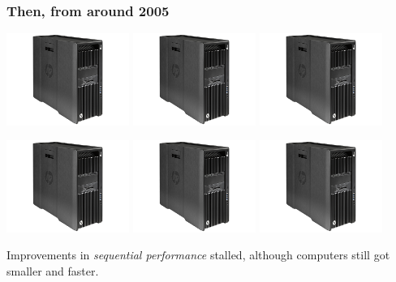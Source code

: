 \documentclass{beamer}
\begin{document}
\begin{frame}
  \frametitle{Then, from around 2005}
  \begin{center}
    \includegraphics[width=0.3\textwidth]{img/hp.jpg}
    \includegraphics[width=0.3\textwidth]{img/hp.jpg}
    \includegraphics[width=0.3\textwidth]{img/hp.jpg}

    \includegraphics[width=0.3\textwidth]{img/hp.jpg}
    \includegraphics[width=0.3\textwidth]{img/hp.jpg}
    \includegraphics[width=0.3\textwidth]{img/hp.jpg}
  \end{center}

  Improvements in \textit{sequential performance} stalled, although
  computers still got smaller and faster.
\end{frame}
\end{document}
